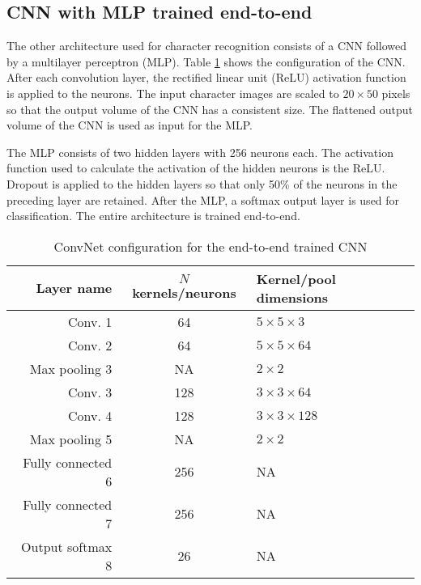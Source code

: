 \subsection{CNN with MLP trained end-to-end}
\label{sec:hmdcnn}

The other architecture used for character recognition consists of a CNN followed by a multilayer perceptron (MLP). Table \ref{tab:hmdcnnconf} shows the configuration of the CNN. After each convolution layer, the rectified linear unit (ReLU) activation function is applied to the neurons. The input character images are scaled to $20 \times 50$ pixels so that the output volume of the CNN has a consistent size. The flattened output volume of the CNN is used as input for the MLP. 

The MLP consists of two hidden layers with 256 neurons each. The activation function used to calculate the activation of the hidden neurons is the ReLU. Dropout is applied to the hidden layers so that only 50\% of the neurons in the preceding layer are retained. After the MLP, a softmax output layer is used for classification. The entire architecture is trained end-to-end. 

\begin{table}
\renewcommand{\arraystretch}{1.3}
\centering
\caption{ConvNet configuration for the end-to-end trained CNN}
\begin{tabular}{r|cl}\hline
Layer name & $N$ kernels/neurons & Kernel/pool dimensions \\ \hline \hline
Conv. 1 & 64 & $5 \times 5 \times 3$  \\
Conv. 2 & 64 & $5 \times 5 \times 64$ \\
Max pooling 3 & NA & $2\times 2$ \\
Conv. 3 & 128 & $3 \times 3 \times 64$ \\
Conv. 4 & 128 & $3 \times 3 \times 128$ \\
Max pooling 5 & NA & $2\times 2$ \\ 
Fully connected 6 & 256 & NA \\
Fully connected 7 & 256 & NA \\
Output softmax 8 & 26 & NA \\ \hline
\end{tabular}
\label{tab:hmdcnnconf}
\end{table}
